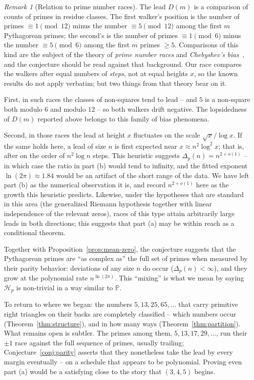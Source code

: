 \documentclass{article}
\theoremstyle{plain}
\theoremstyle{definition}
\theoremstyle{remark}
\newtheorem{remark}{Remark}
\begin{document}
\begin{remark}[Relation to prime number races]
The lead $D(m)$ is a comparison of counts of primes in residue classes. The
first walker's position is the number of primes $\equiv 1 \pmod{12}$ minus
the number $\equiv 5 \pmod{12}$ among the first $m$ Pythagorean primes; the
second's is the number of primes $\equiv 1 \pmod 6$ minus the number
$\equiv 5 \pmod 6$ among the first $m$ primes $\ge 5$. Comparisons of this
kind are the subject of the theory of {\em prime number races\/} and
{\em Chebyshev's bias\/}~\cite{rubinstein-sarnak, granville-martin}, and the
conjecture should be read against that background. Our race compares the
walkers after equal numbers of {\em steps\/}, not at equal heights $x$, so
the known results do not apply verbatim; but two things from that theory
bear on it.

First, in such races the classes of non-squares tend to lead -- and $5$ is a
non-square both modulo $6$ and modulo $12$ -- so both walkers drift
negative. The lopsidedness of $D(m)$ reported above belongs to this family
of bias phenomena.

Second, in those races the lead at height $x$ fluctuates on the scale
$\sqrt{x} / \log x$. If the same holds here, a lead of size $n$ is first
expected near $x \approx n^2 \log^2 x$; that is, after on the order of
$n^2 \log n$ steps. This heuristic suggests
$\Delta_p(n) = n^{2 + o(1)}$ -- in which case the ratio in part (b) would
tend to infinity, and the fitted exponent $\ln(2\pi) \approx 1.84$ would be
an artifact of the short range of the data. We have left part (b) as the
numerical observation it is, and record $n^{2 + o(1)}$ here as the growth
this heuristic predicts. Likewise, under the hypotheses that are standard
in this area (the generalized Riemann hypothesis together with linear
independence of the relevant zeros), races of this type attain arbitrarily
large leads in both directions; this suggests that part (a) may be within
reach as a conditional theorem.
\end{remark}

Together with Proposition~\ref{prop:mean-zero}, the conjecture suggests that
the Pythagorean primes are ``as complex as'' the full set of primes when
measured by their parity behavior: deviations of any size $n$ do occur
($\Delta_p(n) < \infty$), and they grow at the polynomial rate
$n^{\ln(2\pi)}$. This ``mixing'' is what we mean by saying $\mathcal{H}_p$ is
non-trivial in a way similar to $\mathbb{P}$.

To return to where we began: the numbers $5, 13, 25, 65, \ldots$ that
carry primitive right triangles on their backs are completely classified --
which numbers occur (Theorem~\ref{thm:structure}), and in how many ways
(Theorem~\ref{thm:partition}). What remains open is subtler. The primes
among them, $5, 13, 17, 29, \ldots$, run their $\pm 1$ race against the
full sequence of primes, usually trailing; Conjecture~\ref{conj:parity}
asserts that they nonetheless take the lead by every margin eventually --
on a schedule that appears to be polynomial. Proving even part (a) would
be a satisfying close to the story that $(3,4,5)$ begins.
\end{document}
